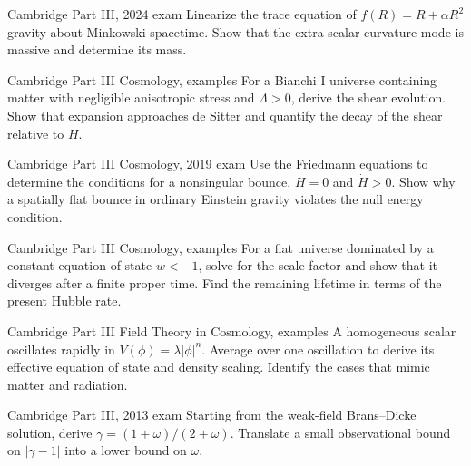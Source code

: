 \begin{exercise}{Cambridge Part III, 2024 exam}
Linearize the trace equation of \(f(R)=R+\alpha R^2\) gravity about
Minkowski spacetime.  Show that the extra scalar curvature mode is massive
and determine its mass.
\end{exercise}

\begin{exercise}{Cambridge Part III Cosmology, examples}
For a Bianchi I universe containing matter with negligible anisotropic stress
and \(\Lambda>0\), derive the shear evolution.  Show that expansion approaches
de Sitter and quantify the decay of the shear relative to \(H\).
\end{exercise}

\begin{exercise}{Cambridge Part III Cosmology, 2019 exam}
Use the Friedmann equations to determine the conditions for a nonsingular
bounce, \(H=0\) and \(\dot H>0\).  Show why a spatially flat bounce in ordinary
Einstein gravity violates the null energy condition.
\end{exercise}

\begin{exercise}{Cambridge Part III Cosmology, examples}
For a flat universe dominated by a constant equation of state \(w<-1\), solve
for the scale factor and show that it diverges after a finite proper time.
Find the remaining lifetime in terms of the present Hubble rate.
\end{exercise}

\begin{exercise}{Cambridge Part III Field Theory in Cosmology, examples}
A homogeneous scalar oscillates rapidly in
\(V(\phi)=\lambda|\phi|^n\).  Average over one oscillation to derive its
effective equation of state and density scaling.  Identify the cases that
mimic matter and radiation.
\end{exercise}

\begin{exercise}{Cambridge Part III, 2013 exam}
Starting from the weak-field Brans--Dicke solution, derive
\(\gamma=(1+\omega)/(2+\omega)\).  Translate a small observational bound on
\(|\gamma-1|\) into a lower bound on \(\omega\).
\end{exercise}

